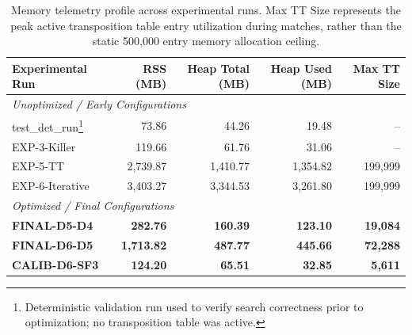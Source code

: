 \begin{table}[htbp]
\centering
\caption[Memory Telemetry Profile across Configurations]{Memory telemetry profile across experimental runs. Max TT Size represents the peak active transposition table entry utilization during matches, rather than the static 500,000 entry memory allocation ceiling.}
\label{tab:memory_profile}
\begin{minipage}{\textwidth}
\begin{tabularx}{\textwidth}{Xrrrr}
\toprule
\textbf{Experimental Run} & \textbf{RSS (MB)} & \textbf{Heap Total (MB)} & \textbf{Heap Used (MB)} & \textbf{Max TT Size} \\
\midrule
\multicolumn{5}{l}{\textit{Unoptimized / Early Configurations}} \\
test\_det\_run\footnote{Deterministic validation run used to verify search correctness prior to optimization; no transposition table was active.}         & 73.86  & 44.26  & 19.48   & -- \\
EXP-3-Killer           & 119.66 & 61.76  & 31.06   & -- \\
EXP-5-TT               & 2,739.87 & 1,410.77 & 1,354.82 & 199,999 \\
EXP-6-Iterative        & 3,403.27 & 3,344.53 & 3,261.80 & 199,999 \\
\midrule
\multicolumn{5}{l}{\textit{Optimized / Final Configurations}} \\
\textbf{FINAL-D5-D4}   & \textbf{282.76}  & \textbf{160.39}  & \textbf{123.10}  & \textbf{19,084} \\
\textbf{FINAL-D6-D5}   & \textbf{1,713.82} & \textbf{487.77}  & \textbf{445.66}  & \textbf{72,288} \\
\textbf{CALIB-D6-SF3}  & \textbf{124.20}  & \textbf{65.51}   & \textbf{32.85}   & \textbf{5,611} \\
\bottomrule
\end{tabularx}
\end{minipage}
\end{table}



